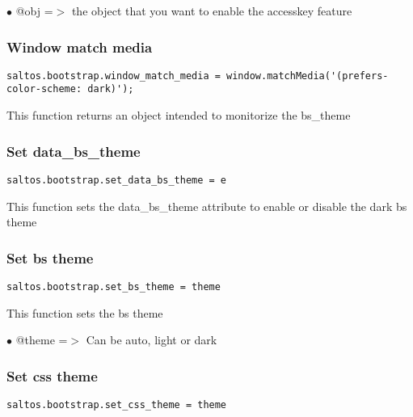 \documentclass[a4paper]{article}
\begin{document}
\begin{compactitem}
\item[\color{myblue}$\bullet$] @obj =$>$ the object that you want to enable the accesskey feature
\end{compactitem}

\hypertarget{toc668}{}
\subsubsection{Window match media}

\begin{lstlisting}
saltos.bootstrap.window_match_media = window.matchMedia('(prefers-color-scheme: dark)');
\end{lstlisting}

This function returns an object intended to monitorize the bs\_theme

\hypertarget{toc669}{}
\subsubsection{Set data\_bs\_theme}

\begin{lstlisting}
saltos.bootstrap.set_data_bs_theme = e
\end{lstlisting}

This function sets the data\_bs\_theme attribute to enable or disable the dark bs theme

\hypertarget{toc670}{}
\subsubsection{Set bs theme}

\begin{lstlisting}
saltos.bootstrap.set_bs_theme = theme
\end{lstlisting}

This function sets the bs theme

\begin{compactitem}
\item[\color{myblue}$\bullet$] @theme =$>$ Can be auto, light or dark
\end{compactitem}

\hypertarget{toc671}{}
\subsubsection{Set css theme}

\begin{lstlisting}
saltos.bootstrap.set_css_theme = theme
\end{lstlisting}
\end{document}
